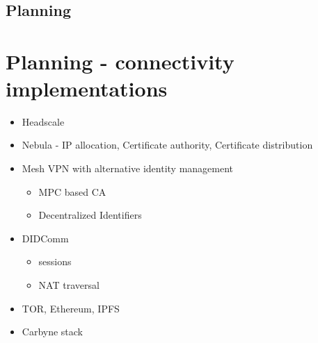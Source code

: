 \hypertarget{section}{%
\chapter{}\label{section}}

\section{Planning}

\hypertarget{planning---connectivity-implementations}{%
\chapter{Planning - connectivity
implementations}\label{planning---connectivity-implementations}}

\begin{itemize}
\tightlist
\item
  Headscale
\item
  Nebula - IP allocation, Certificate authority, Certificate
  distribution
\item
  Mesh VPN with alternative identity management

  \begin{itemize}
  \tightlist
  \item
    MPC based CA
  \item
    Decentralized Identifiers
  \end{itemize}
\item
  DIDComm

  \begin{itemize}
  \tightlist
  \item
    sessions
  \item
    NAT traversal
  \end{itemize}
\item
  TOR, Ethereum, IPFS
\item
  Carbyne stack
\end{itemize}
